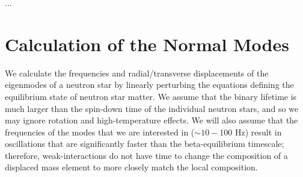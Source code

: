 \documentclass[fleqn,usenatbib]{mnras}
\begin{document}
...









\section{Calculation of the Normal Modes}
\hspace{\parindent}We calculate the frequencies and radial/transverse displacements of the eigenmodes of a neutron star by linearly perturbing the equations defining the equilibrium state of neutron star matter. We assume that the binary lifetime is much larger than the spin-down time of the individual neutron stars, and so we may ignore rotation and high-temperature effects. We will also assume that the frequencies of the modes that we are interested in ($\sim 10 - 100$ Hz) result in oscillations that are significantly faster than the beta-equilibrium timescale; therefore, weak-interactions do not have time to change the composition of a displaced mass element to more closely match the local composition.
\end{document}
